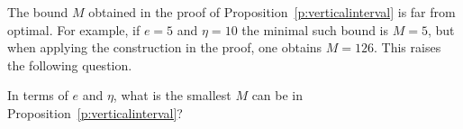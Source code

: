 \documentclass[ALCO]{cedram}
\begin{document}
The bound $M$ obtained in the proof of Proposition~\ref{p:verticalinterval} is far from optimal.  For example, if $e = 5$ and $\eta = 10$ the minimal such bound is $M = 5$, but when applying the construction in the proof, one obtains $M = 126$. This raises the following question.  

\begin{question}\label{q:verticalinterval}
In terms of $e$ and $\eta$, what is the smallest $M$ can be in Proposition~\ref{p:verticalinterval}?
\end{question}







\end{document}
